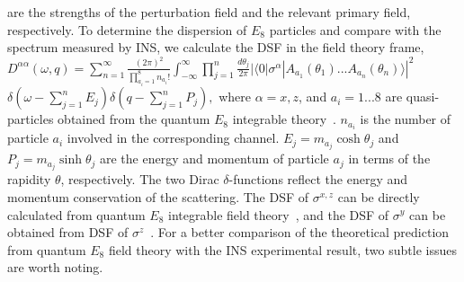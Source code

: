 \documentclass[aps,prl,twocolumn,superscriptaddress,groupedaddress]{revtex4}
\begin{document}
are the strengths of the perturbation field and the relevant primary field, respectively. To determine the dispersion of $E_8$ particles and compare with the spectrum measured by INS, we calculate the DSF in the field theory frame, $D^{\alpha\alpha}(\omega,q)=\sum_{n=1}^{\infty}\frac{(2\pi)^2}{\prod_{a_{i}=1}^{8} n_{a_{i}}!}\int_{-\infty}^{\infty}\prod_{j=1}^{n}\frac{d\theta_{j}}{2\pi}|\langle 0|\sigma^{\alpha}|A_{a_{1}}(\theta_{1})...A_{a_{n}}(\theta_{n})\rangle|^{2}$\\
$\delta(\omega-\sum_{j=1}^{n}E_{j})\delta(q-\sum_{j=1}^{n}P_{j}),$
where $\alpha=x,z$, and $a_{i}=1...8$ are quasi-particles obtained from the quantum $E_{8}$ integrable theory~\cite{Zamolodchikov:1989fp,DELFINO1995724,Zou_2021,xiao_2021}. $n_{a_{i}}$ is the number of particle $a_{i}$ involved in the corresponding channel. $E_{j}=m_{a_{j}}\cosh\theta_{j}$ and $P_{j}=m_{a_{j}}\sinh\theta_{j}$ are the energy and momentum of particle $a_{j}$ in terms of the rapidity $\theta$, respectively. The two Dirac $\delta$-functions reflect the energy and momentum conservation of the scattering. The DSF of $\sigma^{x,z}$ can be directly calculated from quantum $E_{8}$ integrable field theory~\cite{xiao_2021}, and the DSF of $\sigma^{y}$ can be obtained from DSF of $\sigma^{z}$~\cite{PhysRevLett.113.247201}. 
For a better comparison of the theoretical prediction from quantum $E_8$ field theory with the INS experimental result, two subtle issues are worth noting.




\end{document}
